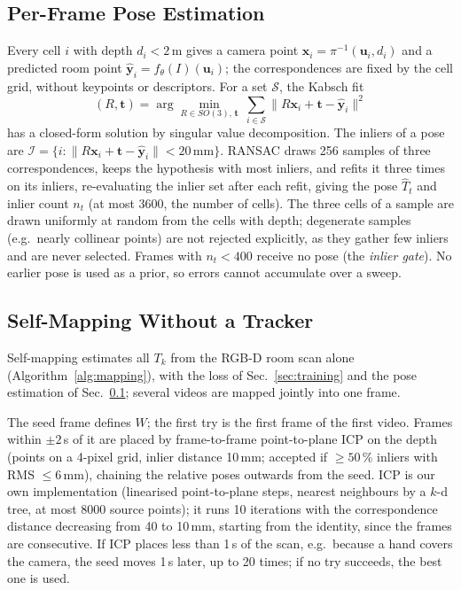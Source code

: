 \documentclass[9pt,shortpaper,twoside,web]{ieeecolor2}
\begin{document}
\subsection{Per-Frame Pose Estimation}
\label{sec:pose}
Every cell $i$ with depth $d_i<2$\,m gives a camera point $\mathbf{x}_i=\pi^{-1}(\mathbf{u}_i,d_i)$ and a predicted room point $\hat{\mathbf{y}}_i=f_\theta(I)(\mathbf{u}_i)$; the correspondences are fixed by the cell grid, without keypoints or descriptors. For a set $\mathcal{S}$, the Kabsch fit \cite{kabsch1976}
\begin{equation}
  (R,\mathbf{t})=\arg\min_{R\in SO(3),\,\mathbf{t}}\ \sum_{i\in\mathcal{S}}\|R\mathbf{x}_i+\mathbf{t}-\hat{\mathbf{y}}_i\|^2
  \label{eq:kabsch}
\end{equation}
has a closed-form solution by singular value decomposition. The inliers of a pose are $\mathcal{I}=\{i:\|R\mathbf{x}_i+\mathbf{t}-\hat{\mathbf{y}}_i\|<20\,\mathrm{mm}\}$. RANSAC \cite{fischler1981ransac} draws 256 samples of three correspondences, keeps the hypothesis with most inliers, and refits it three times on its inliers, re-evaluating the inlier set after each refit, giving the pose $\hat T_t$ and inlier count $n_t$ (at most 3600, the number of cells). The three cells of a sample are drawn uniformly at random from the cells with depth; degenerate samples (e.g.\ nearly collinear points) are not rejected explicitly, as they gather few inliers and are never selected. Frames with $n_t<400$ receive no pose (the \emph{inlier gate}). No earlier pose is used as a prior, so errors cannot accumulate over a sweep.

\subsection{Self-Mapping Without a Tracker}
\label{sec:mapping}
Self-mapping estimates all $T_k$ from the RGB-D room scan alone (Algorithm~\ref{alg:mapping}), with the loss of Sec.~\ref{sec:training} and the pose estimation of Sec.~\ref{sec:pose}; several videos are mapped jointly into one frame.

The seed frame defines $W$; the first try is the first frame of the first video. Frames within $\pm2$\,s of it are placed by frame-to-frame point-to-plane ICP on the depth \cite{chen1992icp,TODO-low2004} (points on a 4-pixel grid, inlier distance 10\,mm; accepted if $\ge50$\,\% inliers with RMS $\le6$\,mm), chaining the relative poses outwards from the seed. ICP is our own implementation (linearised point-to-plane steps, nearest neighbours by a $k$-d tree, at most 8000 source points); it runs 10 iterations with the correspondence distance decreasing from 40 to 10\,mm, starting from the identity, since the frames are consecutive. If ICP places less than 1\,s of the scan, e.g.\ because a hand covers the camera, the seed moves 1\,s later, up to 20 times; if no try succeeds, the best one is used.
\end{document}
